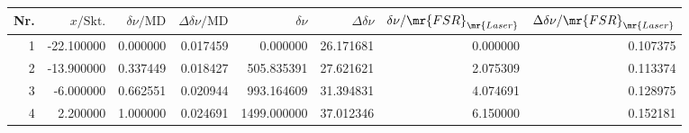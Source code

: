 \begin{tabular}{rrrrrrrr}
\toprule
Nr. & $x/\mathrm{Skt.}$ & $\delta\nu/\mathrm{MD}$ & $\Delta\delta\nu/\mathrm{MD}$ & $\delta\nu$ & $\Delta\delta\nu$ & $\delta\nu/\mr{FSR}_\mr{Laser}$ & $\Delta\delta\nu/\mr{FSR}_\mr{Laser}$ \\
\midrule
1 & -22.100000 & 0.000000 & 0.017459 & 0.000000 & 26.171681 & 0.000000 & 0.107375 \\
2 & -13.900000 & 0.337449 & 0.018427 & 505.835391 & 27.621621 & 2.075309 & 0.113374 \\
3 & -6.000000 & 0.662551 & 0.020944 & 993.164609 & 31.394831 & 4.074691 & 0.128975 \\
4 & 2.200000 & 1.000000 & 0.024691 & 1499.000000 & 37.012346 & 6.150000 & 0.152181 \\
\bottomrule
\end{tabular}
